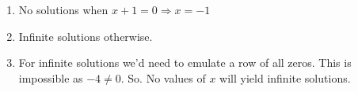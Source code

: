 \documentclass{article}
\begin{document}
                \begin{enumerate}[label=(\Roman*)]
                    \item No solutions when $x+1=0 \Rightarrow x=-1$
                    \item Infinite solutions otherwise.
                    \item 
                        For infinite solutions we'd need to emulate a row of all zeros.
                        This is impossible as $-4 \neq 0$.
                        So. No values of $x$ will yield infinite solutions.
                \end{enumerate}
\end{document}
